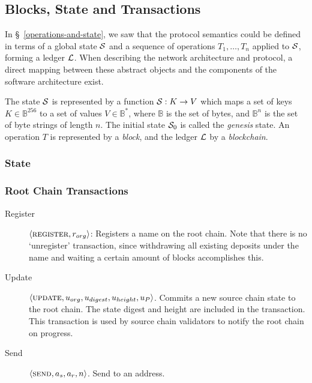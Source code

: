 \subsection{Blocks, State and Transactions}

In \S~\ref{operations-and-state}, we saw that the protocol semantics could
be defined in terms of a global state $\mathcal{S}$ and a sequence of operations
$T_1,\dots,T_n$ applied to $\mathcal{S}$, forming a ledger $\mathcal{L}$. When
describing the network architecture and protocol, a direct mapping between
these abstract objects and the components of the software architecture exist.

The state $\mathcal{S}$ is represented by a function $\mathcal{S} : K \to V$ which maps a
set of keys $K \in \mathbb{B}^{256}$ to a set of values $V \in \mathbb{B}^{*}$,
where $\mathbb{B}$ is the set of bytes, and $\mathbb{B}^n$ is the set of byte
strings of length $n$. The initial state $\mathcal{S}_0$ is called the
\emph{genesis} state. An operation $T$ is represented by a \emph{block}, and
the ledger $\mathcal{L}$ by a \emph{blockchain}.

\subsubsection{State}


\subsubsection{Root Chain Transactions}

\begin{description}
    \item[Register] $\langle \text{\normalfont\scshape register}, r_{org} \rangle$: Registers a
        name on the root chain. Note that there is no `unregister'
        transaction, since withdrawing all existing deposits under the name and
        waiting a certain amount of blocks accomplishes this.
    \item[Update] $\langle \text{\normalfont\scshape update}, u_{org}, u_{digest}, u_{height}, u_{P} \rangle$. Commits
        a new source chain state to the root chain. The state digest and height
        are included in the transaction. This transaction is used by source
        chain validators to notify the root chain on progress.
    \item[Send] $\langle \text{\normalfont\scshape send}, a_s, a_r, n \rangle$. Send \oscoin{} to an address.
\end{description}

